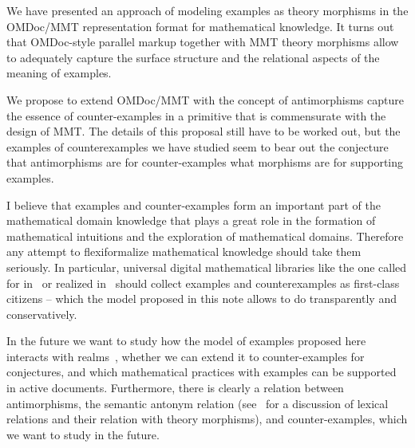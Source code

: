 \documentclass[11pt]{bluenote}
\def\mmt{MMT\xspace}
\def\omdoc{OMDoc\xspace}
\def\omdoc{OMDoc\xspace}
\begin{document}
We have presented an approach of modeling examples as theory morphisms in the \omdoc/\mmt
representation format for mathematical knowledge.  It turns out that \omdoc-style parallel
markup together with \mmt theory morphisms allow to adequately capture the surface
structure and the relational aspects of the meaning of examples.

We propose to extend \omdoc/\mmt with the concept of antimorphisms capture the essence of
counter-examples in a primitive that is commensurate with the design of \mmt. The details
of this proposal still have to be worked out, but the examples of counterexamples we have
studied seem to bear out the conjecture that antimorphisms are for counter-examples what
morphisms are for supporting examples. 

I believe that examples and counter-examples form an important part of the mathematical
domain knowledge that plays a great role in the formation of mathematical intuitions and
the exploration of mathematical domains. Therefore any attempt to flexiformalize
mathematical knowledge should take them seriously. In particular, universal digital
mathematical libraries like the one called for in~\cite{Farmer:mkm11} or realized
in~\cite{IanJucKoh:sdm14,MathHub:on} should collect examples and counterexamples as
first-class citizens -- which the model proposed in this note allows to do transparently
and conservatively.

In the future we want to study how the model of examples proposed here interacts with
realms~\cite{CarFarKoh:rsckmt14}, whether we can extend it to counter-examples for
conjectures, and which mathematical practices with examples can be supported in active
documents. Furthermore, there is clearly a relation between antimorphisms, the semantic
antonym relation (see~\cite{Kohlhase:dmesmgm14} for a discussion of lexical relations and
their relation with theory morphisms), and counter-examples, which we want to study in the
future.

\printbibliography
\end{document}
